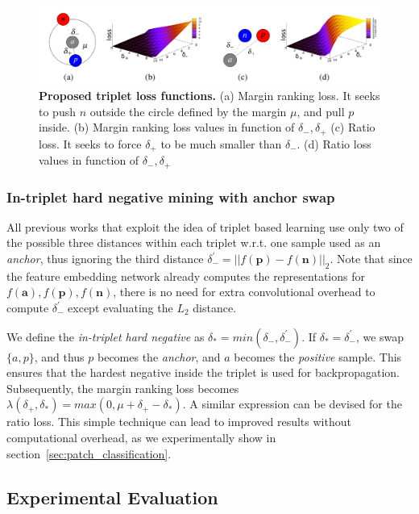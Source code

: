\begin{figure}[t]
    \centering
    \includegraphics[width=\linewidth]{main/chapter02/images/tfeat_losses.png}
    \caption[Proposed triplet loss functions]{\textbf{Proposed triplet loss functions.} (a) Margin ranking loss. It seeks to push $n$ outside
  the circle defined by the margin $\mu$, and pull $p$ inside. (b)
  Margin ranking loss values in function of $\delta_{-},\delta_{+}$
  (c) Ratio loss. It seeks to force
  $\delta_{+}$ to be much smaller than $\delta_{-}$. (d)
  Ratio loss values in function of $\delta_{-},\delta_{+}$}
\label{fig:losses}
\end{figure}  


\subsubsection{In-triplet hard negative mining with anchor swap}

All previous works that exploit the idea of triplet based learning use only two of
the possible three distances within each triplet w.r.t. one
sample  used as an \textit{anchor}, thus ignoring the
third distance 
$\delta_{-}^{'} = ||f(\boldsymbol p)-f(\boldsymbol n)||_2.$ Note that
since the feature embedding network already computes the
representations for
$f(\boldsymbol a), f(\boldsymbol p), f(\boldsymbol n) $, there is no
need for extra convolutional overhead to compute
$\delta_{-}^{'}$ except
evaluating the $L_2$ distance.

We define the \textit{in-triplet hard negative} as
$\delta_{*} = min(\delta_{-},\delta_{-}^{'})$. If
$\delta_{*} = \delta_{-}^{'}$, we swap $\{a,p\}$, and thus $p$ becomes
the \textit{anchor}, and $a$ becomes the \textit{positive}
sample. This ensures that the hardest negative inside the triplet 
is used for backpropagation. Subsequently, the margin ranking loss
becomes $\lambda(\delta_+,\delta_*) = max(0, \mu
+\delta_+-\delta_*)$. A similar expression can be devised for the
ratio loss.  This simple technique can lead to improved
results without  computational overhead, as we experimentally show in section~\ref{sec:patch_classification}. 

\subsection{Experimental Evaluation}

